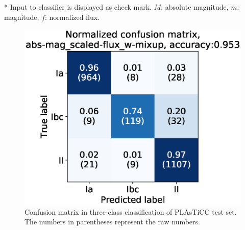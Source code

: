 \documentclass[useamsfonts]{pasj01}
\begin{document}
\begin{table}[ht]
\label{tab:p_test}
\begin{tabnote}
* Input to classifier is displayed as check mark. $M$: absolute magnitude, $m$: magnitude, $f$: normalized flux.
\end{tabnote}
\end{table}
%
\begin{figure}[ht]
  \begin{center}
     \includegraphics[width=\columnwidth]{figures/06_CM_abs-mag_scaled-flux_w-mixup_predictions_test_2.eps}
  \end{center}
  \caption{%
  Confusion matrix in three-class classification of PLAsTiCC test set. The numbers in parentheses represent the raw numbers.
  }%
  \label{fig:plasticc_3class_CM}
\end{figure}
%
\end{document}
